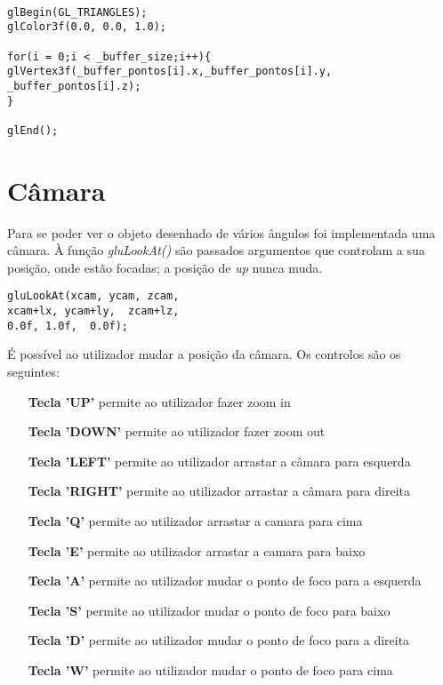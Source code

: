 \begin{Verbatim}

glBegin(GL_TRIANGLES);
glColor3f(0.0, 0.0, 1.0);

for(i = 0;i < _buffer_size;i++){
glVertex3f(_buffer_pontos[i].x,_buffer_pontos[i].y,
_buffer_pontos[i].z);
}

glEnd();
\end{Verbatim}



\section{Câmara}

Para se poder ver o objeto desenhado de vários ângulos foi implementada uma câmara.  
À função \textit{gluLookAt()} são passados argumentos que controlam a sua posição, onde estão focadas; a posição de \textit{up} nunca muda. 

\begin{Verbatim}
gluLookAt(xcam, ycam, zcam,
xcam+lx, ycam+ly,  zcam+lz,
0.0f, 1.0f,  0.0f);
\end{Verbatim}

É possível ao utilizador mudar a posição da câmara. Os controlos são os seguintes:

\begin{itemize}
	\item[\textbf{Tecla 'UP'}] permite ao utilizador fazer zoom in
	\item[\textbf{Tecla 'DOWN'}] permite ao utilizador fazer zoom out
	\item[\textbf{Tecla 'LEFT'}] permite ao utilizador arrastar a câmara para esquerda
	\item[\textbf{Tecla 'RIGHT'}] permite ao utilizador arrastar a câmara para direita
	\item[\textbf{Tecla 'Q'}] permite ao utilizador arrastar a camara para cima
	\item[\textbf{Tecla 'E'}] permite ao utilizador arrastar a camara para baixo 
	\item[\textbf{Tecla 'A'}] permite ao utilizador mudar o ponto de foco para a esquerda
	\item[\textbf{Tecla 'S'}] permite ao utilizador mudar o ponto de foco para baixo
	\item[\textbf{Tecla 'D'}] permite ao utilizador mudar o ponto de foco para a direita
	\item[\textbf{Tecla 'W'}] permite ao utilizador mudar o ponto de foco para cima

\end{itemize}



